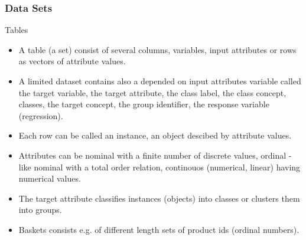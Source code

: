 \documentclass{beamer}
\begin{document}
\begin{frame}
\frametitle{Data Sets}
\begin{block}{Tables}
\begin{itemize}
\item A table (a set) consist of several columns, variables, input attributes or rows as vectors of attribute values.
\item A limited dataset contains also a depended on input attributes variable called the target variable, the target attribute, the class label, the class concept, classes, the target concept, the group identifier, the response variable (regression).
\item Each row can be called an instance, an object descibed by attribute values.
\item Attributes can be nominal with a finite number of discrete values, ordinal - like nominal with a total order relation, continouos (numerical, linear) having numerical values.
\item The target attribute classifies instances (objects) into classes or clusters them into groups.
\end{itemize}
\end{block}
\scriptsize
\begin{block}{}
\begin{itemize}
\item Baskets consists e.g. of different length sets of product ids (ordinal numbers).
\end{itemize}
\end{block}
\end{frame}
\end{document}
